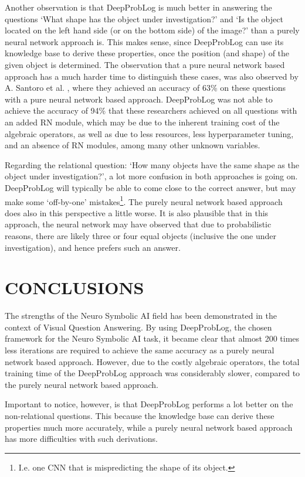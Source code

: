 \documentclass[english]{sobraep}
\begin{document}
Another observation is that DeepProbLog is much better in answering the questions `What shape has the object under investigation?' and `Is the object located on the left hand side (or on the bottom side) of the image?' than a purely neural network approach is. This makes sense, since DeepProbLog can use its knowledge base to derive these properties, once the position (and shape) of the given object is determined. The observation that a pure neural network based approach has a much harder time to distinguish these cases, was also observed by A. Santoro et al. \cite{sort_of_clevr_dataset}, where they achieved an accuracy of 63\% on these questions with a pure neural network based approach. DeepProbLog was not able to achieve the accuracy of 94\% that these researchers achieved on all questions with an added RN module, which may be due to the inherent training cost of the algebraic operators, as well as due to less resources, less hyperparameter tuning, and an absence of RN modules, among many other unknown variables.

Regarding the relational question: `How many objects have the same shape as the object under investigation?', a lot more confusion in both approaches is going on. DeepProbLog will typically be able to come close to the correct answer, but may make some `off-by-one' mistakes\footnote{I.e. one CNN that is mispredicting the shape of its object.}. The purely neural network based approach does also in this perspective a little worse. It is also plausible that in this approach, the neural network may have observed that due to probabilistic reasons, there are likely three or four equal objects (inclusive the one under investigation), and hence prefers such an answer.

\section{CONCLUSIONS}
\label{sec:conclusions}
The strengths of the Neuro Symbolic AI field has been demonstrated in the context of Visual Question Answering. By using DeepProbLog, the chosen framework for the Neuro Symbolic AI task, it became clear that almost 200 times less iterations are required to achieve the same accuracy as a purely neural network based approach. However, due to the costly algebraic operators, the total training time of the DeepProbLog approach was considerably slower, compared to the purely neural network based approach. 

Important to notice, however, is that DeepProbLog performs a lot better on the non-relational questions. This because the knowledge base can derive these properties much more accurately, while a purely neural network based approach has more difficulties with such derivations.
\end{document}
